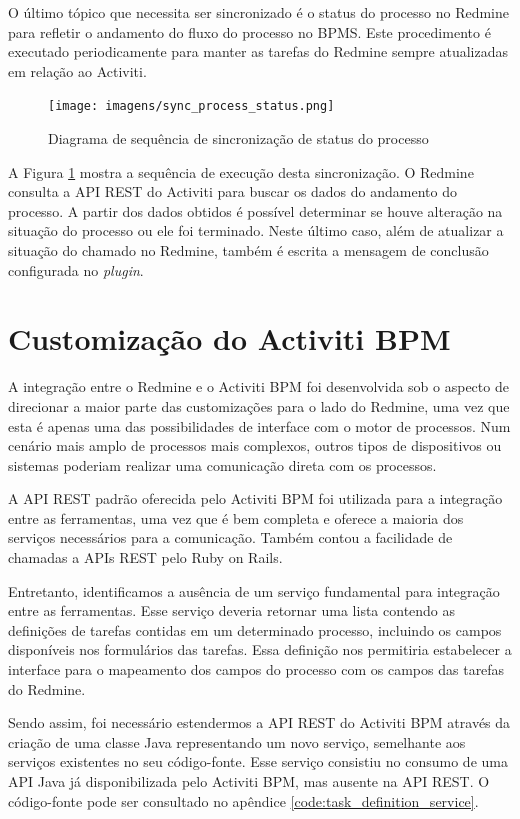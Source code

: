 O último tópico que necessita ser sincronizado é o \textit{}{status} do processo no Redmine para refletir o andamento do fluxo do processo no BPMS. Este procedimento é executado periodicamente para manter as tarefas do Redmine sempre atualizadas em relação ao Activiti.

\begin{figure}[H]
\centering
\texttt{[image: imagens/sync\_process\_status.png]}
\caption{Diagrama de sequência de sincronização de status do processo}
\label{fig:sync_process_status}
\end{figure}

A Figura \ref{fig:sync_process_status} mostra a sequência de execução desta sincronização. O Redmine consulta a API REST do Activiti para buscar os dados do andamento do processo. A partir dos dados obtidos é possível determinar se houve alteração na situação do processo ou ele foi terminado. Neste último caso, além de atualizar a situação do chamado no Redmine, também é escrita a mensagem de conclusão configurada no \textit{plugin}.

\section{Customização do Activiti BPM}\label{sec:integracao_redmine_activiti-implementacao-activiti}

A integração entre o Redmine e o Activiti BPM foi desenvolvida sob o aspecto de direcionar a maior parte das customizações para o lado do Redmine, uma vez que esta é apenas uma das possibilidades de interface com o motor de processos. Num cenário mais amplo de processos mais complexos, outros tipos de dispositivos ou sistemas poderiam realizar uma comunicação direta com os processos.

A API REST padrão oferecida pelo Activiti BPM foi utilizada para a integração entre as ferramentas, uma vez que é bem completa e oferece a maioria dos serviços necessários para a comunicação. Também contou a facilidade de chamadas a APIs REST pelo Ruby on Rails. 

Entretanto, identificamos a ausência de um serviço fundamental para integração entre as ferramentas. Esse serviço deveria retornar uma lista contendo as definições de tarefas contidas em um determinado processo, incluindo os campos disponíveis nos formulários das tarefas. Essa definição nos permitiria estabelecer a interface para o mapeamento dos campos do processo com os campos das tarefas do Redmine.

Sendo assim, foi necessário estendermos a API REST do Activiti BPM através da criação de uma classe Java representando um novo serviço, semelhante aos serviços existentes no seu código-fonte. Esse serviço consistiu no consumo de uma API Java já disponibilizada pelo Activiti BPM, mas ausente na API REST. O código-fonte pode ser consultado no apêndice \ref{code:task_definition_service}.